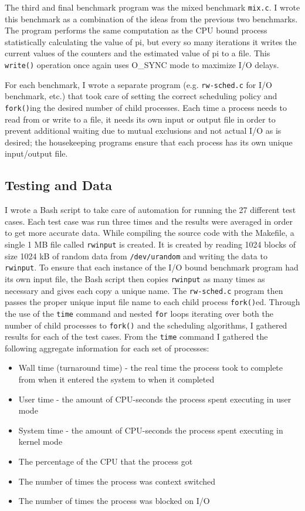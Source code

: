 The third and final benchmark program was the mixed benchmark  \texttt{mix.c}.  I wrote this benchmark as a combination of the ideas from the previous two benchmarks.  The program performs the same computation as the CPU bound process statistically calculating the value of pi, but every so many iterations it writes the current values of the counters and the estimated value of pi to a file.  This \texttt{write()} operation once again uses O\_SYNC mode to maximize I/O delays.

For each benchmark, I wrote a separate program (e.g. \texttt{rw-sched.c} for I/O benchmark, etc.) that took care of setting the correct scheduling policy and \texttt{fork()}ing the desired number of child processes.  Each time a process needs to read from or write to a file, it needs its own input or output file in order to prevent additional waiting due to mutual exclusions and not actual I/O as is desired; the housekeeping programs ensure that each process has its own unique input/output file.

\subsection{Testing and Data}

I wrote a Bash script to take care of automation for running the 27 different test cases.  Each test case was run three times and the results were averaged in order to get more accurate data.  While compiling the source code with the Makefile, a single 1 MB file called \texttt{rwinput} is created.  It is created by reading 1024 blocks of size 1024 kB of random data from \texttt{/dev/urandom} and writing the data to \texttt{rwinput}.  To ensure that each instance of the I/O bound benchmark program had its own input file, the Bash script then copies \texttt{rwinput} as many times as necessary and gives each copy a unique name.  The \texttt{rw-sched.c} program then passes the proper unique input file name to each child process \texttt{fork()}ed.  Through the use of the \texttt{time} command and nested \texttt{for} loops iterating over both the number of child processes to \texttt{fork()} and the scheduling algorithms, I gathered results for each of the test cases.  From the \texttt{time} command I gathered the following aggregate information for each set of processes:

\begin{itemize}
  \item Wall time (turnaround time) - the real time the process took to complete from when it entered the system to when it completed
  \item User time - the amount of CPU-seconds the process spent executing in user mode
  \item System time - the amount of CPU-seconds the process spent executing in kernel mode
  \item The percentage of the CPU that the process got
  \item The number of times the process was context switched
  \item The number of times the process was blocked on I/O
\end{itemize}

